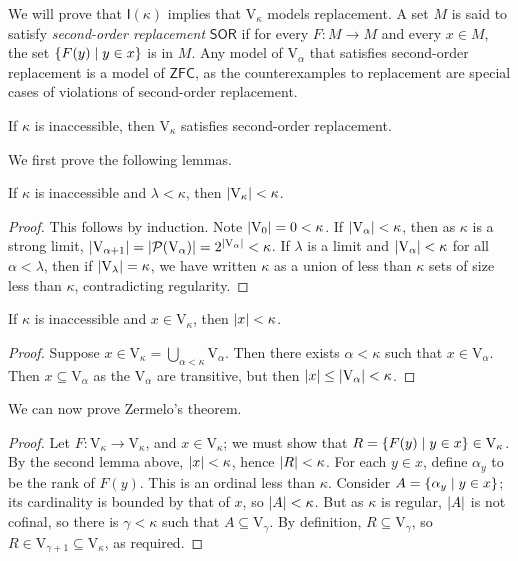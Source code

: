 We will prove that \( \mathsf{I}(\kappa) \) implies that \( \mathrm{V}_\kappa \) models replacement.
A set \( M \) is said to satisfy \emph{second-order replacement} \( \mathsf{SOR} \) if for every \( F : M \to M \) and every \( x \in M \), the set \( \qty{F(y) \mid y \in x} \) is in \( M \).
Any model of \( \mathrm{V}_\alpha \) that satisfies second-order replacement is a model of \( \mathsf{ZFC} \), as the counterexamples to replacement are special cases of violations of second-order replacement.

\begin{theorem}[Zermelo]
    If \( \kappa \) is inaccessible, then \( \mathrm{V}_\kappa \) satisfies second-order replacement.
\end{theorem}
We first prove the following lemmas.
\begin{lemma}
    If \( \kappa \) is inaccessible and \( \lambda < \kappa \), then \( \abs{\mathrm{V}_\kappa} < \kappa \).
\end{lemma}
\begin{proof}
    This follows by induction.
    Note \( \abs{\mathrm{V}_0} = 0 < \kappa \).
    If \( \abs{\mathrm{V}_\alpha} < \kappa \), then as \( \kappa \) is a strong limit, \( \abs{\mathrm{V}_{\alpha + 1}} = \abs{\mathcal P(\mathrm{V}_\alpha)} = 2^{\abs{\mathrm{V}_\alpha}} < \kappa \).
    If \( \lambda \) is a limit and \( \abs{\mathrm{V}_\alpha} < \kappa \) for all \( \alpha < \lambda \), then if \( \abs{\mathrm{V}_\lambda} = \kappa \), we have written \( \kappa \) as a union of less than \( \kappa \) sets of size less than \( \kappa \), contradicting regularity.
\end{proof}
\begin{lemma}
    If \( \kappa \) is inaccessible and \( x \in \mathrm{V}_\kappa \), then \( \abs{x} < \kappa \).
\end{lemma}
\begin{proof}
    Suppose \( x \in \mathrm{V}_\kappa = \bigcup_{\alpha < \kappa} \mathrm{V}_\alpha \).
    Then there exists \( \alpha < \kappa \) such that \( x \in \mathrm{V}_\alpha \).
    Then \( x \subseteq \mathrm{V}_\alpha \) as the \( \mathrm{V}_\alpha \) are transitive, but then \( \abs{x} \leq \abs{\mathrm{V}_\alpha} < \kappa \).
\end{proof}
We can now prove Zermelo's theorem.
\begin{proof}
    Let \( F : \mathrm{V}_\kappa \to \mathrm{V}_\kappa \), and \( x \in \mathrm{V}_\kappa \); we must show that \( R = \qty{F(y) \mid y \in x} \in \mathrm{V}_\kappa \).
    By the second lemma above, \( \abs{x} < \kappa \), hence \( \abs{R} < \kappa \).
    For each \( y \in x \), define \( \alpha_y \) to be the rank of \( F(y) \).
    This is an ordinal less than \( \kappa \).
    Consider \( A = \qty{\alpha_y \mid y \in x} \); its cardinality is bounded by that of \( x \), so \( \abs{A} < \kappa \).
    But as \( \kappa \) is regular, \( \abs{A} \) is not cofinal, so there is \( \gamma < \kappa \) such that \( A \subseteq \mathrm{V}_\gamma \).
    By definition, \( R \subseteq \mathrm{V}_\gamma \), so \( R \in \mathrm{V}_{\gamma + 1} \subseteq \mathrm{V}_\kappa \), as required.
\end{proof}
